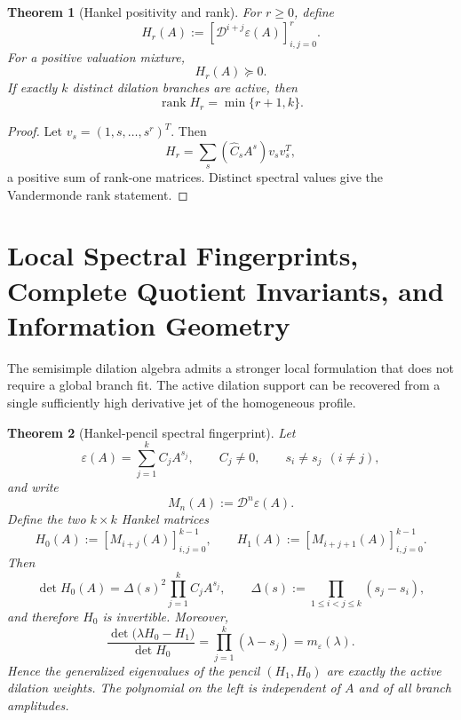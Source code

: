 \documentclass[aps,prd,preprint,onecolumn,nofootinbib,superscriptaddress,showkeys]{revtex4-2}
\numberwithin{equation}{section}
\theoremstyle{definition}
\theoremstyle{plain}
\newtheorem{theorem}{Theorem}[section]
\newcommand{\Dil}{\mathscr D}
\begin{document}
\begin{theorem}[Hankel positivity and rank]
For \(r\ge0\), define
\[
H_r(A):=\left[\Dil^{i+j}\varepsilon(A)\right]_{i,j=0}^{r}.
\]
For a positive valuation mixture,
\begin{equation}
H_r(A)\succeq0.
\end{equation}
If exactly \(k\) distinct dilation branches are active, then
\begin{equation}
\operatorname{rank}H_r=\min\{r+1,k\}.
\end{equation}
\end{theorem}

\begin{proof}
Let \(v_s=(1,s,\ldots,s^r)^T\).  Then
\[
H_r=\sum_s(\widehat C_sA^s)v_sv_s^T,
\]
a positive sum of rank-one matrices.  Distinct spectral values give the Vandermonde rank statement.
\end{proof}


\section{Local Spectral Fingerprints, Complete Quotient Invariants, and Information Geometry}

The semisimple dilation algebra admits a stronger local formulation that does not require a global branch fit.  The active dilation support can be recovered from a single sufficiently high derivative jet of the homogeneous profile.

\begin{theorem}[Hankel-pencil spectral fingerprint]\label{thm:hankel-pencil}
Let
\begin{equation}
\varepsilon(A)=\sum_{j=1}^{k} C_j A^{s_j},
\qquad
C_j\neq0,
\qquad
s_i\neq s_j\ \ (i\neq j),
\end{equation}
and write
\begin{equation}
M_n(A):=\Dil^n\varepsilon(A).
\end{equation}
Define the two $k\times k$ Hankel matrices
\begin{equation}
H_0(A):=[M_{i+j}(A)]_{i,j=0}^{k-1},
\qquad
H_1(A):=[M_{i+j+1}(A)]_{i,j=0}^{k-1}.
\end{equation}
Then
\begin{equation}
\det H_0(A)
=
\Delta(s)^2\prod_{j=1}^{k} C_j A^{s_j},
\qquad
\Delta(s):=\prod_{1\le i<j\le k}(s_j-s_i),
\end{equation}
and therefore $H_0$ is invertible.  Moreover,
\begin{equation}
\boxed{
\frac{\det\!\bigl(\lambda H_0-H_1\bigr)}{\det H_0}
=
\prod_{j=1}^{k}(\lambda-s_j)
=
 m_\varepsilon(\lambda).
}
\end{equation}
Hence the generalized eigenvalues of the pencil $(H_1,H_0)$ are exactly the active dilation weights.  The polynomial on the left is independent of $A$ and of all branch amplitudes.
\end{theorem}
\end{document}
